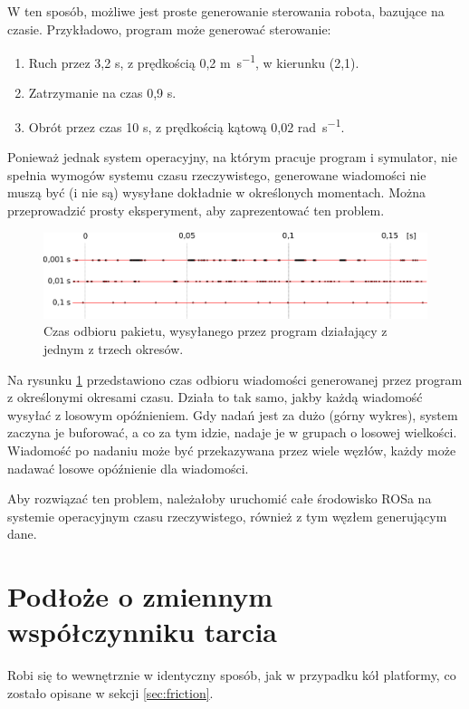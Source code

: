 	W ten sposób, możliwe jest proste generowanie sterowania robota, bazujące na czasie.
	Przykładowo, program może generować sterowanie:
	\begin{enumerate}
		\item Ruch przez 3,2 \si{\second}, z prędkością 0,2 \si{\metre\per\second}, w kierunku (2,1).
		\item Zatrzymanie na czas 0,9 \si{\second}.
		\item Obrót przez czas 10 \si{\second}, z prędkością kątową 0,02 \si{\radian\per\second}.
	\end{enumerate}
	
	Ponieważ jednak system operacyjny, na którym pracuje program i symulator, nie spełnia wymogów systemu czasu rzeczywistego, generowane wiadomości
	nie muszą być (i nie są) wysyłane dokładnie w określonych momentach. Można przeprowadzić prosty eksperyment, aby zaprezentować ten problem.
	
	\begin{figure}[H]
	\centering
	\includegraphics[width=\textwidth]{graphics/gramofon.pdf}
	\caption{Czas odbioru pakietu, wysyłanego przez program działający z jednym z trzech okresów.}
	\label{fig:gramofon}
	\end{figure}
	
	Na rysunku \ref{fig:gramofon} przedstawiono czas odbioru wiadomości generowanej przez program z określonymi okresami czasu.
	Działa to tak samo, jakby każdą wiadomość wysyłać z losowym opóźnieniem.
	Gdy nadań jest za dużo (górny wykres), system zaczyna je buforować, a co za tym idzie, nadaje je w grupach o losowej wielkości.
	Wiadomość po nadaniu może być przekazywana przez wiele węzłów, każdy może nadawać losowe opóźnienie dla wiadomości.\
	
	Aby rozwiązać ten problem, należałoby uruchomić całe środowisko ROSa na systemie operacyjnym czasu rzeczywistego,
	również z tym węzłem generującym dane.
	
\section{Podłoże o zmiennym współczynniku tarcia}
	Robi się to wewnętrznie w identyczny sposób, jak w przypadku kół platformy, co zostało opisane w sekcji \ref{sec:friction}.
	
